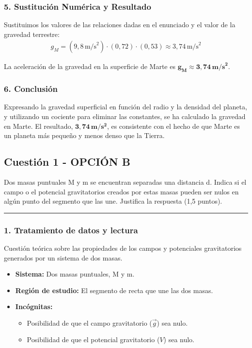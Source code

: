 \subsubsection*{5. Sustitución Numérica y Resultado}
Sustituimos los valores de las relaciones dadas en el enunciado y el valor de la gravedad terrestre:
\begin{gather}
    g_M = (9,8 \, \text{m/s}^2) \cdot (0,72) \cdot (0,53) \approx 3,74 \, \text{m/s}^2
\end{gather}
\begin{cajaresultado}
La aceleración de la gravedad en la superficie de Marte es $\boldsymbol{g_M \approx 3,74 \, \textbf{m/s}^2}$.
\end{cajaresultado}

\subsubsection*{6. Conclusión}
\begin{cajaconclusion}
Expresando la gravedad superficial en función del radio y la densidad del planeta, y utilizando un cociente para eliminar las constantes, se ha calculado la gravedad en Marte. El resultado, $\mathbf{3,74 \, m/s^2}$, es consistente con el hecho de que Marte es un planeta más pequeño y menos denso que la Tierra.
\end{cajaconclusion}

\newpage

\subsection{Cuestión 1 - OPCIÓN B}
\label{subsec:1B_2009_sep_ext}

\begin{cajaenunciado}
Dos masas puntuales M y m se encuentran separadas una distancia d. Indica si el campo o el potencial gravitatorios creados por estas masas pueden ser nulos en algún punto del segmento que las une. Justifica la respuesta (1,5 puntos).
\end{cajaenunciado}
\hrule

\subsubsection*{1. Tratamiento de datos y lectura}
Cuestión teórica sobre las propiedades de los campos y potenciales gravitatorios generados por un sistema de dos masas.
\begin{itemize}
    \item \textbf{Sistema:} Dos masas puntuales, M y m.
    \item \textbf{Región de estudio:} El segmento de recta que une las dos masas.
    \item \textbf{Incógnitas:}
        \begin{itemize}
            \item Posibilidad de que el campo gravitatorio ($\vec{g}$) sea nulo.
            \item Posibilidad de que el potencial gravitatorio ($V$) sea nulo.
        \end{itemize}
\end{itemize}

